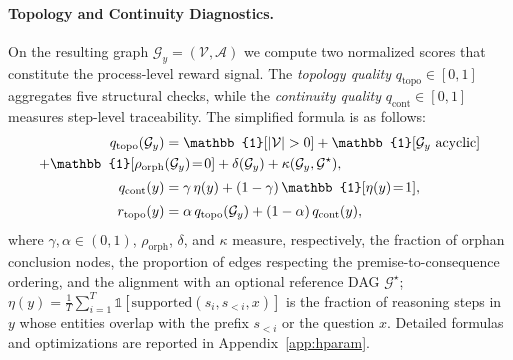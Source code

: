 \paragraph{Topology and Continuity Diagnostics.}
\label{sec:diagnostics}
On the resulting graph $\mathcal{G}_y\!=\!(\mathcal{V},\mathcal{A})$ we compute two normalized scores that constitute the process-level reward signal. The \emph{topology quality} $q_{\mathrm{topo}}\!\in\![0,1]$ aggregates five structural checks, while the \emph{continuity quality} $q_{\mathrm{cont}}\!\in\![0,1]$ measures step-level traceability. The simplified formula is as follows:
\begin{align}
q_{\mathrm{topo}}(\mathcal{G}_y) &= \mathbb{1}[|\mathcal{V}|>0]
+\mathbb{1}[\mathcal{G}_y\text{ acyclic}] \notag\\
+\mathbb{1}[\rho_{\mathrm{orph}}&(\mathcal{G}_y)\!=\!0]+\delta(\mathcal{G}_y)
+\kappa(\mathcal{G}_y,\mathcal{G}^{\star}), \label{eq:qtopo}\\[2pt]
q_{\mathrm{cont}}(y) &= \gamma\,\eta(y)+(1-\gamma)\,\mathbb{1}[\eta(y)\!=\!1], \label{eq:qcont}\\[2pt]
r_{\mathrm{topo}}(y) &= \alpha\,q_{\mathrm{topo}}(\mathcal{G}_y)+(1-\alpha)\,q_{\mathrm{cont}}(y), \label{eq:rtopo}
\end{align}
where $\gamma,\alpha\!\in\!(0,1)$, $\rho_{\mathrm{orph}}$, $\delta$, and $\kappa$ measure, respectively, the fraction of orphan conclusion nodes, the proportion of edges respecting the premise-to-consequence ordering, and the alignment with an optional reference DAG $\mathcal{G}^{\star}$; $\eta(y)=\tfrac{1}{T}\sum_{i=1}^{T}\mathbb{1}[\mathrm{supported}(s_i,s_{<i},x)]$
is the fraction of reasoning steps in $y$ whose entities overlap with the prefix $s_{<i}$ or the question $x$. Detailed formulas and optimizations are reported in Appendix~\ref{app:hparam}.

